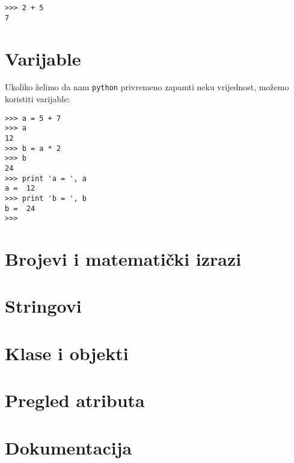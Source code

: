 \begin{verbatim}
>>> 2 + 5
7
\end{verbatim}

\section{Varijable}

Ukoliko želimo da nam \verb+python+ privremeno zapamti neku vrijednost, možemo koristiti varijable:

\begin{verbatim}
>>> a = 5 + 7
>>> a
12
>>> b = a * 2
>>> b
24
>>> print 'a = ', a
a =  12
>>> print 'b = ', b
b =  24
>>> 
\end{verbatim}

\section{Brojevi i matematički izrazi}

\section{Stringovi}

\section{Klase i objekti}

\section{Pregled atributa}

\section{Dokumentacija}
